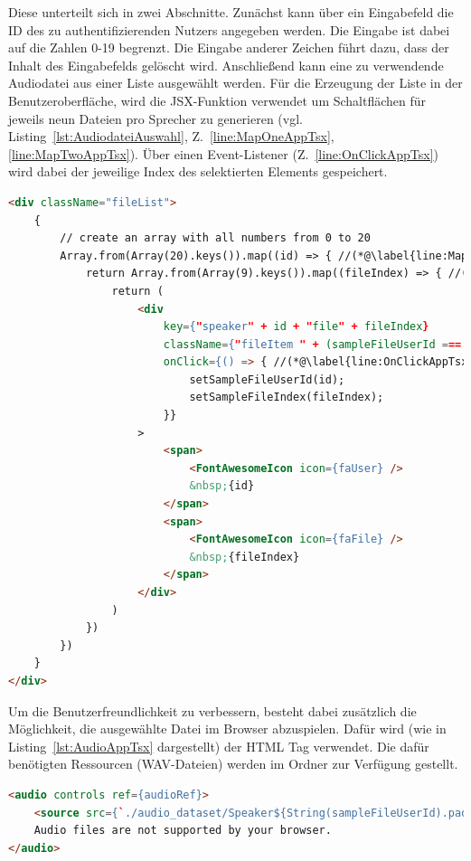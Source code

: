 Diese unterteilt sich in zwei Abschnitte.
Zunächst kann über ein Eingabefeld die ID des zu authentifizierenden Nutzers angegeben werden.
Die Eingabe ist dabei auf die Zahlen 0-19 begrenzt.
Die Eingabe anderer Zeichen führt dazu, dass der Inhalt des Eingabefelds gelöscht wird.
Anschließend kann eine zu verwendende Audiodatei aus einer Liste ausgewählt werden.
Für die Erzeugung der Liste in der Benutzeroberfläche, wird die JSX-Funktion  verwendet um Schaltflächen für jeweils neun Dateien pro Sprecher zu generieren (vgl. Listing~\ref{lst:AudiodateiAuswahl}, Z.~\ref{line:MapOneAppTsx},\ref{line:MapTwoAppTsx}).
Über einen  Event-Listener (Z.~\ref{line:OnClickAppTsx}) wird dabei der jeweilige Index des selektierten Elements gespeichert.
\begin{lstlisting}[language=HTML,caption=Auswahl der Audiodatei - App.tsx,label=lst:AudiodateiAuswahl]
<div className="fileList">
    {
        // create an array with all numbers from 0 to 20
        Array.from(Array(20).keys()).map((id) => { //(*@\label{line:MapOneAppTsx}@*)
            return Array.from(Array(9).keys()).map((fileIndex) => { //(*@\label{line:MapTwoAppTsx}@*)
                return (
                    <div 
                        key={"speaker" + id + "file" + fileIndex}
                        className={"fileItem " + (sampleFileUserId === id && sampleFileIndex === fileIndex ? "selected" : "")}
                        onClick={() => { //(*@\label{line:OnClickAppTsx}@*)
                            setSampleFileUserId(id);
                            setSampleFileIndex(fileIndex);
                        }}
                    >
                        <span>
                            <FontAwesomeIcon icon={faUser} />
                            &nbsp;{id}
                        </span>
                        <span>
                            <FontAwesomeIcon icon={faFile} />
                            &nbsp;{fileIndex}
                        </span>
                    </div>
                )
            })
        })
    }
</div>
\end{lstlisting}

Um die Benutzerfreundlichkeit zu verbessern, besteht dabei zusätzlich die Möglichkeit, die ausgewählte Datei im Browser abzuspielen.
Dafür wird (wie in Listing~\ref{lst:AudioAppTsx} dargestellt) der \ac{HTML}  Tag verwendet.
Die dafür benötigten Ressourcen (WAV-Dateien) werden im Ordner  zur Verfügung gestellt.
\begin{lstlisting}[language=HTML,caption=Audio Tag - App.tsx,label=lst:AudioAppTsx]
<audio controls ref={audioRef}>
    <source src={`./audio_dataset/Speaker${String(sampleFileUserId).padStart(4, '0')}/Validation_Speaker${String(sampleFileUserId).padStart(2, '0')}_${String(sampleFileIndex).padStart(4, '0')}.wav`} type="audio/wav" />
    Audio files are not supported by your browser.
</audio>
\end{lstlisting}


